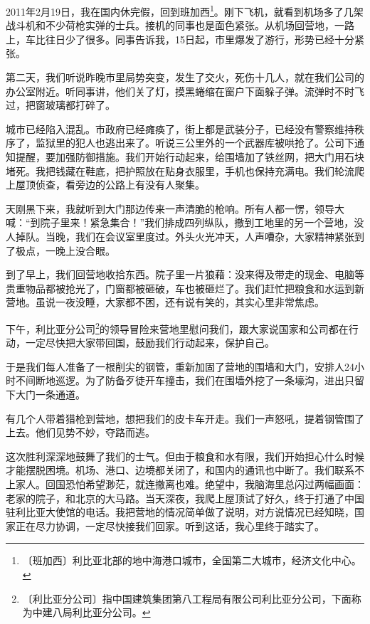 \documentclass[12pt,UTF-8,openany]{ctexbook}
\begin{document}
\begin{Large}
    
    2011年2月19日，我在国内休完假，回到班加西\footnote{〔班加西〕利比亚北部的地中海港口城市，全国第二大城市，经济文化中心。}。刚下飞机，就看到机场多了几架战斗机和不少荷枪实弹的士兵。接机的同事也是面色紧张。从机场回营地，一路上，车比往日少了很多。同事告诉我，15日起，市里爆发了游行，形势已经十分紧张。
    
    第二天，我们听说昨晚市里局势突变，发生了交火，死伤十几人，就在我们公司的办公室附近。听同事讲，他们关了灯，摸黑蜷缩在窗户下面躲子弹。流弹时不时飞过，把窗玻璃都打碎了。
    
    城市已经陷入混乱。市政府已经瘫痪了，街上都是武装分子，已经没有警察维持秩序了，监狱里的犯人也逃出来了。听说三公里外的一个武器库被哄抢了。公司下通知提醒，要加强防御措施。我们开始行动起来，给围墙加了铁丝网，把大门用石块堵死。我把钱藏在鞋底，把护照放在贴身衣服里，手机也保持充满电。我们轮流爬上屋顶侦查，看旁边的公路上有没有人聚集。
    
    天刚黑下来，我就听到大门那边传来一声清脆的枪响。所有人都一愣，领导大喊：“到院子里来！紧急集合！”我们排成四列纵队，撤到工地里的另一个营地，没人掉队。当晚，我们在会议室里度过。外头火光冲天，人声嘈杂，大家精神紧张到了极点，一晚上没合眼。
    
    到了早上，我们回营地收拾东西。院子里一片狼藉：没来得及带走的现金、电脑等贵重物品都被抢光了，门窗都被砸破，车也被砸烂了。我们赶忙把粮食和水运到新营地。虽说一夜没睡，大家都不困，还有说有笑的，其实心里非常焦虑。
    
    下午，利比亚分公司\footnote{〔利比亚分公司〕指中国建筑集团第八工程局有限公司利比亚分公司，下面称为中建八局利比亚分公司。}的领导冒险来营地里慰问我们，跟大家说国家和公司都在行动，一定尽快把大家带回国，鼓励我们行动起来，保护自己。
    
    于是我们每人准备了一根削尖的钢管，重新加固了营地的围墙和大门，安排人24小时不间断地巡逻。为了防备歹徒开车撞击，我们在围墙外挖了一条壕沟，进出只留下大门一条通道。
    
    有几个人带着猎枪到营地，想把我们的皮卡车开走。我们一声怒吼，提着钢管围了上去。他们见势不妙，夺路而逃。
    
    这次胜利深深地鼓舞了我们的士气。但由于粮食和水有限，我们开始担心什么时候才能摆脱困境。机场、港口、边境都关闭了，和国内的通讯也中断了。我们联系不上家人。回国恐怕希望渺茫，就连撤离也难。绝望中，我脑海里总闪过两幅画面：老家的院子，和北京的大马路。当天深夜，我爬上屋顶试了好久，终于打通了中国驻利比亚大使馆的电话。我把营地的情况简单做了说明，对方说情况已经知晓，国家正在尽力协调，一定尽快接我们回家。听到这话，我心里终于踏实了。
    

\end{Large}
\end{document}
